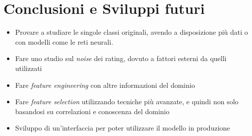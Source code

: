 \section{Conclusioni e Sviluppi futuri}
\noindent

\begin{itemize}[label=-]
    \item Provare a studiare le singole classi originali, avendo a disposizione più dati o con modelli come le reti neurali.
    \item Fare uno studio sul \textit{noise} dei rating, dovuto a fattori esterni da quelli utilizzati
    \item Fare \textit{feature engineering} con altre informazioni del dominio
    \item Fare \textit{feature selection} utilizzando tecniche più avanzate, e quindi non solo basandosi su correlazioni e conoscenza del dominio
    \item Sviluppo di un'interfaccia per poter utilizzare il modello in produzione 
\end{itemize}